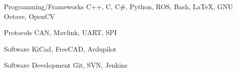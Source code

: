 

\begin{cvskills}

  \cvskill
    {Programming/Frameworks} %
    {C++, C, C\#, Python, ROS, Bash, LaTeX, GNU Octave, OpenCV} %

  \cvskill
    {Protocols} %
    {CAN, Mavlink, UART, SPI} %

  \cvskill
    {Software} %
    {KiCad, FreeCAD, Ardupilot} %

  \cvskill
    {Software Development} %
    {Git, SVN, Jenkins} %

\end{cvskills}
